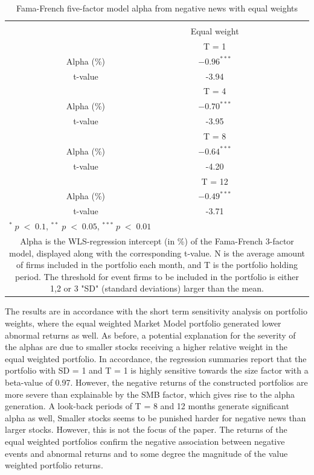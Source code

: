 \setlength{\tabcolsep}{15pt}
\begin{table}[H]
\small
\centering
\caption{Fama-French five-factor model alpha from negative news with equal weights} 
\begin{tabular}{cccc}
\hline \hline \\ 
 &  &  Equal weight   &  \\ \cline{3-3}
& & T = 1 & \\ \cline{2-3}
& Alpha (\%) & $-0.96^{***}$  &  \\ 
& t-value & -3.94  & \\
& & T = 4 & \\  \cline{2-3}
& Alpha (\%)  & $-0.70^{***}$  & \\
& t-value  & -3.95  & \\
& & T = 8 & \\ \cline{2-3}
& Alpha (\%)   & $-0.64^{***}$  &  \\
& t-value &   -4.20  & \\
&  & T = 12 & \\ \cline{2-3}
& Alpha (\%)  & $-0.49^{***}$ &  \\
& t-value   & -3.71  & \\
\hline \hline
 \multicolumn{4}{l}{ \footnotesize $^* \; p\; <\; 0.1$, $ ^{**} \; p\; <\; 0.05$, $ ^{***} \; p\; <\; 0.01$  } \\
 \multicolumn{4}{p{7cm}}{ \footnotesize Alpha is the WLS-regression intercept (in \%) of the Fama-French 3-factor model, displayed along with the corresponding t-value. N is the average amount of firms included in the portfolio each month, and T is the portfolio holding period. The threshold for event firms to be included in the portfolio is either 1,2 or 3 "SD" (standard deviations) larger than the mean.}  \\ 
\end{tabular}
\label{tab: FF5_neg_sensi_weights}
\end{table}

The results are in accordance with the short term sensitivity analysis on portfolio weights, where the equal weighted Market Model portfolio generated lower abnormal returns as well. As before, a potential explanation for the severity of the alphas are due to smaller stocks receiving a higher relative weight in the equal weighted portfolio. In accordance, the regression summaries report that the portfolio with SD = 1 and T = 1 is highly sensitive towards the size factor with a beta-value of 0.97. However, the negative returns of the constructed portfolios are more severe than explainable by the SMB factor, which gives rise to the alpha generation. A look-back periods of T = 8 and 12 months generate significant alpha as well,  Smaller stocks seems to be punished harder for negative news than larger stocks. However, this is not the focus of the paper. The returns of the equal weighted portfolios confirm the negative association between negative events and abnormal returns and to some degree the magnitude of the value weighted portfolio returns.


